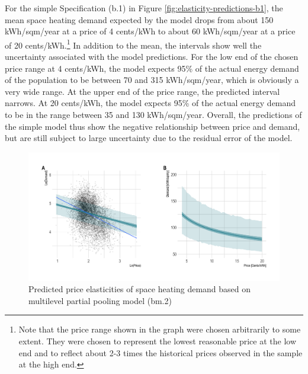 \documentclass[12pt,twoside]{reedthesis}
\begin{document}
For the simple Specification (b.1) in Figure \ref{fig:elasticity-predictions-b1}, the mean space heating demand expected by the model drops from about 150 kWh/sqm/year at a price of 4 cents/kWh to about 60 kWh/sqm/year at a price of 20 cents/kWh.\footnote{Note that the price range shown in the graph were chosen arbitrarily to some extent. They were chosen to represent the lowest reasonable price at the low end and to reflect about 2-3 times the historical prices observed in the sample at the high end.} In addition to the mean, the intervals show well the uncertainty associated with the model predictions. For the low end of the chosen price range at 4 cents/kWh, the model expects 95\% of the actual energy demand of the population to be between 70 and 315 kWh/sqm/year, which is obviously a very wide range. At the upper end of the price range, the predicted interval narrows. At 20 cents/kWh, the model expects 95\% of the actual energy demand to be in the range between 35 and 130 kWh/sqm/year. Overall, the predictions of the simple model thus show the negative relationship between price and demand, but are still subject to large uncertainty due to the residual error of the model.
\begin{figure}

{\centering \includegraphics[width=1.04\linewidth]{figure/bm2_prediction} 

}

\caption{Predicted price elasticities of space heating demand based on multilevel partial pooling model (bm.2)}\label{fig:elasticity-predictions-bm2}
\end{figure}
\end{document}
